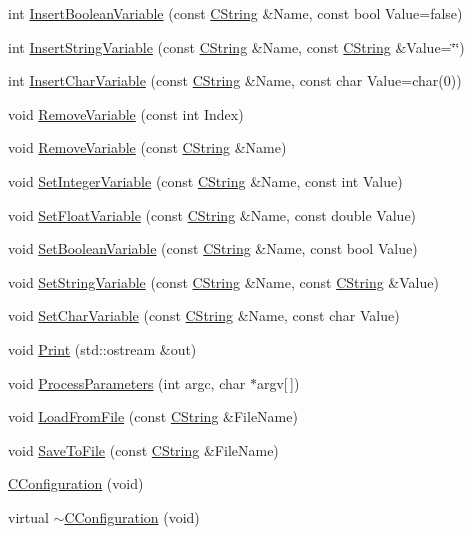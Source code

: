 \begin{DoxyCompactItemize}
\item 
int \hyperlink{classCConfiguration_a30ee323a4668bacd38bbed0d11192f55}{Insert\-Boolean\-Variable} (const \hyperlink{classCString}{C\-String} \&Name, const bool Value=false)
\item 
int \hyperlink{classCConfiguration_aa0006435e2b8a4c5a72ef3d5a0a8849b}{Insert\-String\-Variable} (const \hyperlink{classCString}{C\-String} \&Name, const \hyperlink{classCString}{C\-String} \&Value=\char`\"{}\char`\"{})
\item 
int \hyperlink{classCConfiguration_a2f3e36f9ec1d6ab3076ab46501136bf4}{Insert\-Char\-Variable} (const \hyperlink{classCString}{C\-String} \&Name, const char Value=char(0))
\item 
void \hyperlink{classCConfiguration_aa71a97f192c38fa37df1ad75a7789460}{Remove\-Variable} (const int Index)
\item 
void \hyperlink{classCConfiguration_a2b4c8069b424baabc7eb15b6c91349eb}{Remove\-Variable} (const \hyperlink{classCString}{C\-String} \&Name)
\item 
void \hyperlink{classCConfiguration_a2f69b4e64ee22d43f50d37644cb36c7b}{Set\-Integer\-Variable} (const \hyperlink{classCString}{C\-String} \&Name, const int Value)
\item 
void \hyperlink{classCConfiguration_a18bb6f1546cb662a1cf4bec4deb587ba}{Set\-Float\-Variable} (const \hyperlink{classCString}{C\-String} \&Name, const double Value)
\item 
void \hyperlink{classCConfiguration_a4d9a58e5376e4dc66c72c2b2713cfb31}{Set\-Boolean\-Variable} (const \hyperlink{classCString}{C\-String} \&Name, const bool Value)
\item 
void \hyperlink{classCConfiguration_a37ea2a42c36bcef95fddc28fdd4ac34b}{Set\-String\-Variable} (const \hyperlink{classCString}{C\-String} \&Name, const \hyperlink{classCString}{C\-String} \&Value)
\item 
void \hyperlink{classCConfiguration_a78acb5cc352d63460876b91622d976cc}{Set\-Char\-Variable} (const \hyperlink{classCString}{C\-String} \&Name, const char Value)
\item 
void \hyperlink{classCConfiguration_ad7567abe3549c11531f1b3c599990230}{Print} (std\-::ostream \&out)
\item 
void \hyperlink{classCConfiguration_a9bd44bd2a143aea3b794294f4c12ac7a}{Process\-Parameters} (int argc, char $\ast$argv\mbox{[}$\,$\mbox{]})
\item 
void \hyperlink{classCConfiguration_a18a27bc8369914d3fdb924fb44c63fff}{Load\-From\-File} (const \hyperlink{classCString}{C\-String} \&File\-Name)
\item 
void \hyperlink{classCConfiguration_ad379e27380475b31348f95f04db75257}{Save\-To\-File} (const \hyperlink{classCString}{C\-String} \&File\-Name)
\item 
\hyperlink{classCConfiguration_adc320be38da481ec9c33b02777991425}{C\-Configuration} (void)
\item 
virtual \hyperlink{classCConfiguration_a64473225d29e05323df79c0f17799d8b}{$\sim$\-C\-Configuration} (void)
\end{DoxyCompactItemize}
